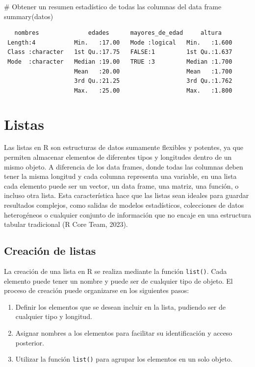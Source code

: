 \documentclass[
  spanish,
  a4paper,
  DIV=11,
  numbers=noendperiod,
  onepage,
  openany]{scrreprt}
\newenvironment{Shaded}{\begin{snugshade}}{\end{snugshade}}
\newcommand{\CommentTok}[1]{\textcolor[rgb]{0.37,0.37,0.37}{#1}}
\newcommand{\FunctionTok}[1]{\textcolor[rgb]{0.28,0.35,0.67}{#1}}
\newcommand{\NormalTok}[1]{\textcolor[rgb]{0.00,0.23,0.31}{#1}}
\begin{document}
\begin{Shaded}
\begin{Highlighting}[]
\CommentTok{\# Obtener un resumen estadístico de todas las columnas del data frame}
\FunctionTok{summary}\NormalTok{(datos)}
\end{Highlighting}
\end{Shaded}

\begin{verbatim}
   nombres              edades      mayores_de_edad     altura     
 Length:4           Min.   :17.00   Mode :logical   Min.   :1.600  
 Class :character   1st Qu.:17.75   FALSE:1         1st Qu.:1.637  
 Mode  :character   Median :19.00   TRUE :3         Median :1.700  
                    Mean   :20.00                   Mean   :1.700  
                    3rd Qu.:21.25                   3rd Qu.:1.762  
                    Max.   :25.00                   Max.   :1.800  
\end{verbatim}

\section{Listas}\label{listas}

Las listas en R son estructuras de datos sumamente flexibles y potentes,
ya que permiten almacenar elementos de diferentes tipos y longitudes
dentro de un mismo objeto. A diferencia de los data frames, donde todas
las columnas deben tener la misma longitud y cada columna representa una
variable, en una lista cada elemento puede ser un vector, un data frame,
una matriz, una función, o incluso otra lista. Esta característica hace
que las listas sean ideales para guardar resultados complejos, como
salidas de modelos estadísticos, colecciones de datos heterogéneos o
cualquier conjunto de información que no encaje en una estructura
tabular tradicional (R Core Team, 2023).

\subsection{Creación de listas}\label{creaciuxf3n-de-listas}

La creación de una lista en R se realiza mediante la función
\texttt{list()}. Cada elemento puede tener un nombre y puede ser de
cualquier tipo de objeto. El proceso de creación puede organizarse en
los siguientes pasos:

\begin{enumerate}
\def\labelenumi{\arabic{enumi}.}
\item
  Definir los elementos que se desean incluir en la lista, pudiendo ser
  de cualquier tipo y longitud.
\item
  Asignar nombres a los elementos para facilitar su identificación y
  acceso posterior.
\item
  Utilizar la función \texttt{list()} para agrupar los elementos en un
  solo objeto.
\end{enumerate}
\end{document}
